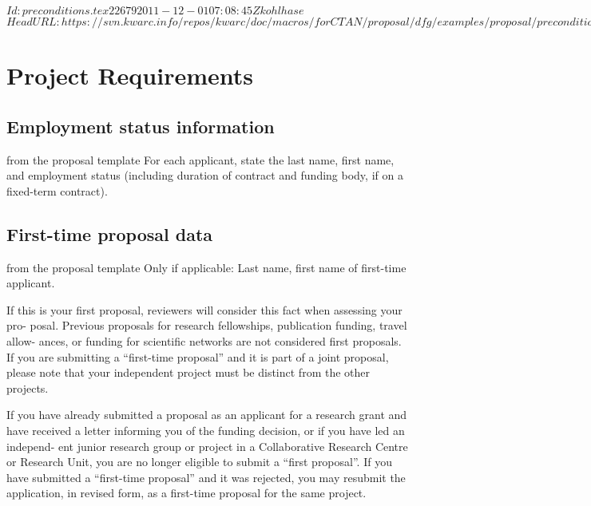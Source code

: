 \svnInfo $Id: preconditions.tex 22679 2011-12-01 07:08:45Z kohlhase $
\svnKeyword $HeadURL: https://svn.kwarc.info/repos/kwarc/doc/macros/forCTAN/proposal/dfg/examples/proposal/preconditions.tex $
\section{Project Requirements }

\subsection{Employment status information }

\begin{todo}{from the proposal template}
For each applicant, state the last name, first name, and employment status (including
duration of contract and funding body, if on a fixed-term contract).
\end{todo}

\subsection{First-time proposal data }

\begin{todo}{from the proposal template}
Only if applicable: Last name, first name of first-time applicant.

If this is your first proposal, reviewers will consider this fact when assessing your pro-
posal. Previous proposals for research fellowships, publication funding, travel allow-
ances, or funding for scientific networks are not considered first proposals. If you are
submitting a “first-time proposal” and it is part of a joint proposal, please note that your
independent project must be distinct from the other projects.

If you have already submitted a proposal as an applicant for a research grant and have
received a letter informing you of the funding decision, or if you have led an independ-
ent junior research group or project in a Collaborative Research Centre or Research
Unit, you are no longer eligible to submit a “first proposal”. If you have submitted a
“first-time proposal” and it was rejected, you may resubmit the application, in revised
form, as a first-time proposal for the same project.
\end{todo}

